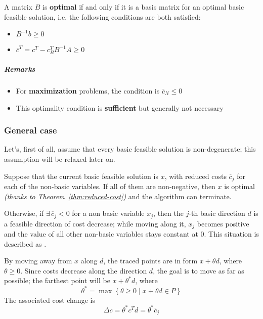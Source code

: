 \documentclass[english]{article}
\begin{document}
\begin{definition}
  A matrix \(B\) is \textbf{optimal} if and only if it is a basis matrix for an optimal basic feasible solution, i.e. the following conditions are both satisfied:

  \begin{itemize}
    \item \(B^{-1} b \geq 0\)
    \item \(\overline{c}^T = c^T - c^T_B B^{-1} A \geq 0\)
  \end{itemize}
  \label{def:optimal-matrix}
\end{definition}

\subparagraph*{Remarks}
\begin{itemize}[label=\(\rightarrow\)]
  \item For \textbf{maximization} problems, the condition is \(\overline{c}_N \leq 0\)
  \item This optimality condition is \textbf{sufficient} but generally not necessary
\end{itemize}

\subsubsection{General case}

Let's, first of all, assume that every basic feasible solution is non-degenerate;
this assumption will be relaxed later on.

Suppose that the current basic feasible solution is \(x\), with reduced costs \(\overline{c}_j\) for each of the non-basic variables.
If all of them are non-negative, then \(x\) is optimal \textit{(thanks to Theorem~\ref{thm:reduced-cost})} and the algorithm can terminate.

Otherwise, if \(\exists \, \overline{c}_j < 0\) for a non basic variable \(x_j\), then the \(j\)-th basic direction \(d\) is a feasible direction of cost decrease;
while moving along it, \(x_j\) becomes positive and the value of all other non-basic variables stays constant at \(0\).
This situation is described as .

By moving away from \(x\) along \(d\), the traced points are in form \(x + \theta d\), where \(\theta \geq 0\).
Since costs decrease along the direction \(d\), the goal is to move as far as possible;
the farthest point will be \(x + \theta^\ast d\), where
\[ \theta^\ast = \max \left\{ \theta \geq 0 \mid x + \theta d \in P \right\}\]
The associated cost change is
\[ \Delta c = \theta^\ast c^T d = \theta^\ast \overline{c}_j \]
\end{document}
